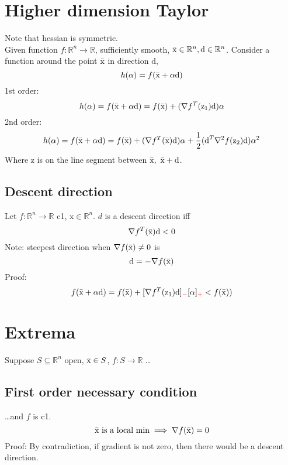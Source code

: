 \documentclass[6pt]{article}
\def\x{\textrm{x}}
\def\z{\textrm{z}}
\def\d{\textrm{d}}
\begin{document}
\begin{comment}
\section{One dimension Taylor}
Let $f:(a,b)\in \mathbb{R}$ sufficiently smooth, $\Bar{x} \in (a,b)$. Then $\forall~x \in (a,b)$ and $k\in\mathbb{N}$ (nonnegative),
\begin{align*}
f(x) &= f(\Bar{x}) + \frac{f'(\Bar{x})}{1!}(x - \Bar{x}) + \ldots + \frac{f^{(k)}(\Bar{x})}{k!}(x - \Bar{x})^k + \frac{f^{(k+1)}(\xi)}{(k+1)!}(x - \Bar{x})^{(k+1)}\\
&= g(x) + remainder
\end{align*}
\end{comment}

\section{Higher dimension Taylor}
Note that hessian is symmetric.\\
Given function $f:\mathbb{R}^n\to \mathbb{R}$, sufficiently smooth, $\Bar{\x} \in \mathbb{R}^n, \d\in\mathbb{R}^n$. Consider a function around the point $\Bar{\x}$ in direction $\d$,
$$h(\alpha) = f(\Bar{\x}+\alpha\d)$$
1st order:
$$h(\alpha) = f(\Bar{\x}+\alpha\d) = f(\Bar{\x}) + (\nabla f^T(\z_1)\d)\alpha$$
2nd order:
$$h(\alpha) = f(\Bar{\x}+\alpha\d) = f(\Bar{\x}) + (\nabla f^T(\Bar{\x})\d)\alpha + \frac{1}{2}(\d^T \nabla^2 f(\z_2)\d)\alpha^2$$
Where $\z$ is on the line segment between $\Bar{\x},~ \Bar{\x}+\d$.

\subsection{Descent direction}
Let $f:\mathbb{R}^{n}\to \mathbb{R}$ c1, $\x \in \mathbb{R}^n$. $d$ is a descent direction iff $$\nabla f^T(\Bar{\x})\d<0$$
Note: steepest direction when $\nabla f(\Bar{\x}) \neq 0$ is $$\d=-\nabla f(\Bar{\x})$$
Proof:
$$f(\Bar{\x}+\alpha\d)=f(\Bar{\x}) + [\nabla f^T(\z_1)\d]_{\color{red}-}[\alpha]_{\color{red}+} < f(\Bar{\x}))$$
\section{Extrema}
Suppose $S\subseteq \mathbb{R}^n$ open, $\Bar{\x} \in S$, $f:S\to \mathbb{R}$ \ldots
\subsection{First order necessary condition}
\ldots and $f$ is c1.
$$\Bar{\x} \textrm{ is a local min}\implies \nabla f(\Bar{\x}) = 0$$
Proof: By contradiction, if gradient is not zero, then there would be a descent direction.
\end{document}
